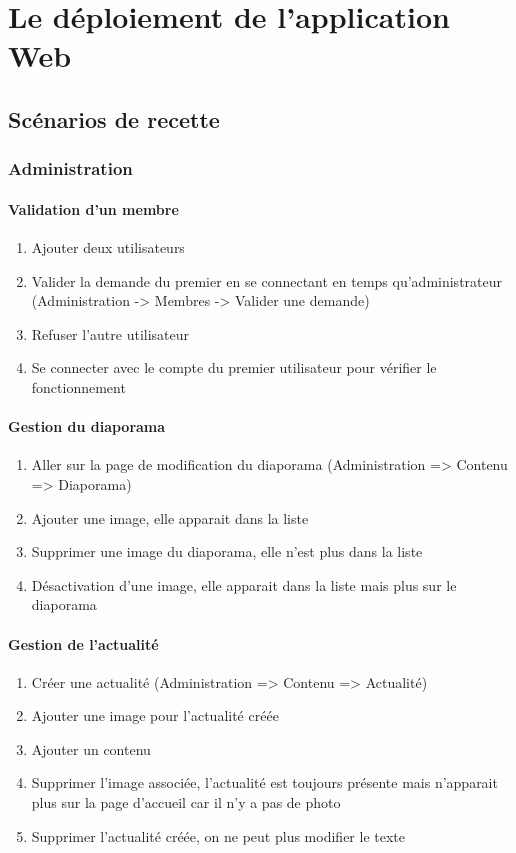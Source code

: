 \documentclass[11pt]{report}
\begin{document}
\chapter{Le déploiement de l'application Web}
\section{Scénarios de recette}
\subsection{Administration}
\subsubsection*{Validation d'un membre}
\begin{enumerate}
\item Ajouter deux utilisateurs
\item Valider la demande du premier en se connectant en temps qu'administrateur (Administration -> Membres -> Valider une demande)
\item Refuser l’autre utilisateur
\item Se connecter avec le compte du premier utilisateur pour vérifier le fonctionnement
\end{enumerate}
\subsubsection*{Gestion du diaporama}
\begin{enumerate}
\item Aller sur la page de modification du diaporama (Administration => Contenu => Diaporama)
\item Ajouter une image, elle apparait dans la liste
\item Supprimer une image du diaporama, elle n'est plus dans la liste
\item Désactivation d’une image, elle apparait dans la liste mais plus sur le diaporama
\end{enumerate}
\subsubsection*{Gestion de l'actualité}
\begin{enumerate}
\item Créer une actualité (Administration => Contenu => Actualité)
\item Ajouter une image pour l’actualité créée
\item Ajouter un contenu
\item Supprimer l’image associée, l'actualité est toujours présente mais n'apparait plus sur la page d'accueil car il n'y a pas de photo
\item Supprimer l’actualité créée, on ne peut plus modifier le texte
\end{enumerate}
\end{document}

